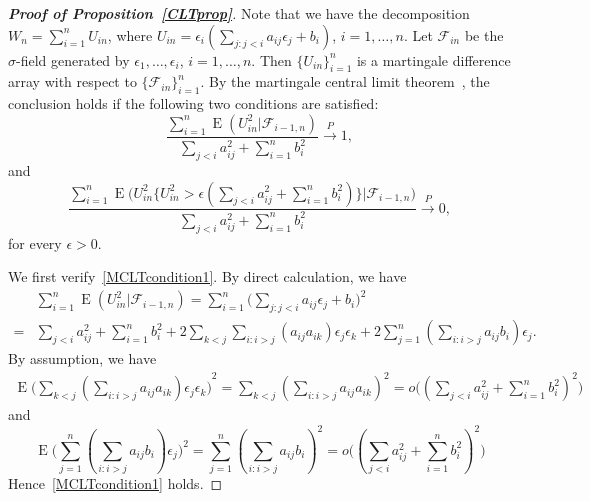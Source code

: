 \documentclass[3p]{elsarticle}
\DeclareMathOperator{\myE}{E}
\theoremstyle{plain}
\theoremstyle{definition}
\theoremstyle{remark}
\begin{document}
 \begin{proof}[\textbf{Proof of Proposition~\ref{CLTprop}}]
     Note that we have the decomposition $W_n=\sum_{i=1}^n U_{in}$, where $U_{in} =\epsilon_i (\sum_{j:j<i} a_{ij}\epsilon_j+b_i )$, $i=1,\ldots,n$.
    Let $\mathcal{F}_{in}$ be the $\sigma$-field generated by $\epsilon_1,\ldots,\epsilon_i$, $i=1,\ldots, n$.
     Then $\{U_{in}\}_{i=1}^n$ is a martingale difference array with respect to $\{\mathcal{F}_{in}\}_{i=1}^n$. 
     By the martingale central limit theorem~\citep[Theorem 1 of Chapter VIII ]{pollard1984convergence}, the conclusion holds if the following two conditions are satisfied:
     \begin{equation}\label{MCLTcondition1}
         \frac{\sum_{i=1}^n \myE(U_{in}^2 |\mathcal{F}_{i-1,n})}{\sum_{j<i} a_{ij}^2+\sum_{i=1}^n b_i^2}\xrightarrow{P} 1,
     \end{equation}
     and
     \begin{equation}\label{MCLTcondition2}
         \frac{\sum_{i=1}^n \myE\big(U_{in}^2\big\{U_{in}^2>\epsilon (\sum_{j<i} a_{ij}^2+\sum_{i=1}^n b_i^2)\big\}\big|\mathcal{F}_{i-1,n}\big)}{\sum_{ j<i} a_{ij}^2+\sum_{i=1}^n b_i^2}\xrightarrow{P} 0,
     \end{equation}
     for every $\epsilon>0$.

     We first verify~\eqref{MCLTcondition1}.
By direct calculation, we have
     \begin{equation*}
         \begin{aligned}
             &\sum_{i=1}^n \myE(U_{in}^2 |\mathcal{F}_{i-1,n})
             =\sum_{i=1}^n \big(\sum_{j:j<i}a_{ij}\epsilon_j +b_i \big)^2\\
             =&\sum_{j<i} a_{ij}^2+\sum_{i=1}^n b_i^2 +2\sum_{k<j} \sum_{i:i>j}(a_{ij}a_{ik})\epsilon_j \epsilon_k+2\sum_{j=1}^n (\sum_{i:i>j} a_{ij}b_i) \epsilon_j.
         \end{aligned}
     \end{equation*}
     By assumption, we have
     \begin{equation*}
         \begin{aligned}
             \myE{\big(\sum_{k<j} (\sum_{i:i>j}a_{ij}a_{ik})\epsilon_j \epsilon_k \big)}^2
             =
             \sum_{k<j} (\sum_{i:i>j}a_{ij}a_{ik})^2
             =
             o\big((\sum_{j<i} a_{ij}^2 +\sum_{i=1}^n b_i^2)^2\big)
         \end{aligned}
     \end{equation*}
     and
     $$
     \myE \big(\sum_{j=1}^n (\sum_{i:i>j} a_{ij}b_i) \epsilon_j\big)^2
     =
     \sum_{j=1}^n (\sum_{i:i>j} a_{ij}b_i)^2 
             =
             o\big((\sum_{j<i} a_{ij}^2 +\sum_{i=1}^n b_i^2)^2\big)
     $$
     Hence~\eqref{MCLTcondition1} holds.


\end{proof}
\end{document}
